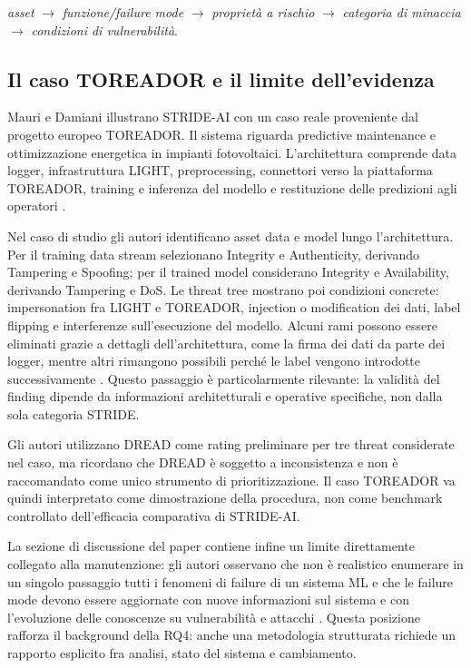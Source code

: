 \documentclass[12pt,a4paper,oneside]{report}
\begin{document}
\begin{center}
\textit{asset} $\rightarrow$ \textit{funzione/failure mode} $\rightarrow$ \textit{proprietà a rischio} $\rightarrow$ \textit{categoria di minaccia} $\rightarrow$ \textit{condizioni di vulnerabilità}.
\end{center}

\subsection{Il caso TOREADOR e il limite dell'evidenza}

Mauri e Damiani illustrano STRIDE-AI con un caso reale proveniente dal progetto europeo TOREADOR. Il sistema riguarda predictive maintenance e ottimizzazione energetica in impianti fotovoltaici. L'architettura comprende data logger, infrastruttura LIGHT, preprocessing, connettori verso la piattaforma TOREADOR, training e inferenza del modello e restituzione delle predizioni agli operatori \citep{mauri2022strideai}.

Nel caso di studio gli autori identificano asset data e model lungo l'architettura. Per il training data stream selezionano Integrity e Authenticity, derivando Tampering e Spoofing; per il trained model considerano Integrity e Availability, derivando Tampering e DoS. Le threat tree mostrano poi condizioni concrete: impersonation fra LIGHT e TOREADOR, injection o modification dei dati, label flipping e interferenze sull'esecuzione del modello. Alcuni rami possono essere eliminati grazie a dettagli dell'architettura, come la firma dei dati da parte dei logger, mentre altri rimangono possibili perché le label vengono introdotte successivamente \citep{mauri2022strideai}. Questo passaggio è particolarmente rilevante: la validità del finding dipende da informazioni architetturali e operative specifiche, non dalla sola categoria STRIDE.

Gli autori utilizzano DREAD come rating preliminare per tre threat considerate nel caso, ma ricordano che DREAD è soggetto a inconsistenza e non è raccomandato come unico strumento di prioritizzazione. Il caso TOREADOR va quindi interpretato come dimostrazione della procedura, non come benchmark controllato dell'efficacia comparativa di STRIDE-AI.

La sezione di discussione del paper contiene infine un limite direttamente collegato alla manutenzione: gli autori osservano che non è realistico enumerare in un singolo passaggio tutti i fenomeni di failure di un sistema ML e che le failure mode devono essere aggiornate con nuove informazioni sul sistema e con l'evoluzione delle conoscenze su vulnerabilità e attacchi \citep{mauri2022strideai}. Questa posizione rafforza il background della RQ4: anche una metodologia strutturata richiede un rapporto esplicito fra analisi, stato del sistema e cambiamento.
\end{document}
